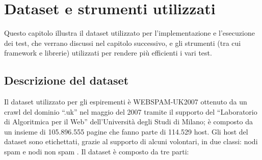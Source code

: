 \chapter{Dataset e strumenti utilizzati}
Questo capitolo illustra il dataset utilizzato per l'implementazione e l'esecuzione dei test,  che verrano discussi nel capitolo successivo, e gli strumenti (tra cui framework e librerie) utilizzati per rendere più efficienti i vari test.
\section{Descrizione del dataset}
Il dataset utilizzato per gli espirementi è WEBSPAM-UK2007 \cite{webspam-uk2007} ottenuto da un crawl del dominio ``.uk'' nel maggio del 2007 tramite il supporto del ``Laboratorio di Algoritmica per il Web'' dell'Università degli Studi di Milano; è composto da un insieme di 105.896.555 pagine che fanno parte di 114.529 host. Gli host del dataset  sono etichettati,  grazie al supporto  di alcuni volontari,  in due classi: nodi spam e nodi non spam . Il dataset è composto da tre parti:
